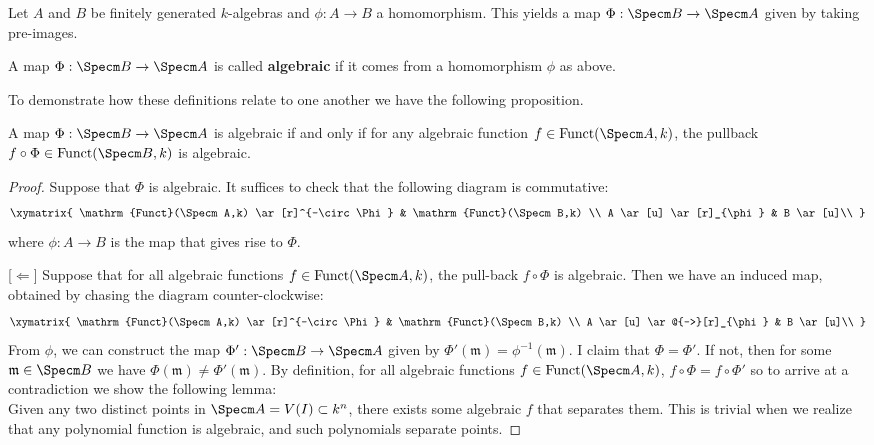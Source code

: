 Let $A$ and $B$ be finitely generated $k$-algebras and $\phi:A\rightarrow B$ a homomorphism.  This yields a map $\Phi:\Specm B\rightarrow \Specm A$ given by taking pre-images.

\begin{definition} A map $\Phi:\Specm B\rightarrow \Specm A$ is called {\bf algebraic} if it comes from a homomorphism $\phi$ as above.\end{definition}

To demonstrate how these definitions relate to one another we have the following proposition.

\begin{proposition} A map $\Phi:\Specm B\rightarrow \Specm A$ is algebraic if and only if for any algebraic function $f\in \mathrm{Funct}(\Specm A,k)$, the pullback $f\circ \Phi\in \mathrm{Funct}(\Specm B,k)$ is algebraic.\end{proposition}

\begin{proof}
Suppose that $\Phi$ is algebraic.  It suffices to check that the following diagram is commutative:
\[ 
\xymatrix{
\mathrm{Funct}(\Specm A,k) \ar[r]^{-\circ\Phi} & \mathrm{Funct}(\Specm B,k) \\
A \ar[u] \ar[r]_{\phi} & B \ar[u]\\
}
\]
where $\phi:A\rightarrow B$ is the map that gives rise to $\Phi$.

[$\Leftarrow$] Suppose that for all algebraic functions $f\in \mathrm{Funct}(\Specm A,k)$, the pull-back $f\circ\Phi$ is algebraic.  Then we have an induced map, obtained by chasing the diagram counter-clockwise:
$$
\xymatrix{
\mathrm{Funct}(\Specm A,k) \ar[r]^{-\circ\Phi} & \mathrm{Funct}(\Specm B,k) \\
A \ar[u] \ar@{-->}[r]_{\phi} & B \ar[u]\\
}
$$
From $\phi$, we can construct the map $\Phi':\Specm B \rightarrow \Specm A$ given by $\Phi'(\mathfrak{m})=\phi^{-1}(\mathfrak{m})$.  I claim that $\Phi=\Phi'$.  If not, then for some $\mathfrak{m}\in \Specm B$ we have $\Phi(\mathfrak{m})\neq \Phi'(\mathfrak{m})$.  By definition, for all algebraic functions $f\in \mathrm{Funct}(\Specm A,k)$, $f\circ\Phi=f\circ\Phi'$ so to arrive at a contradiction we show the following lemma:\\
Given any two distinct points in $\Specm A=V(I)\subset k^n$, there exists some
algebraic $f$ that separates them.  This is trivial when we realize that any
polynomial function is algebraic, and such polynomials separate points.
\end{proof}

